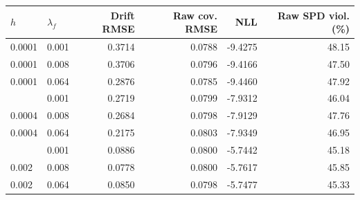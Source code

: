 \begin{tabular}{llrrrr}
\toprule
$h$ & $\lambda_f$ & Drift RMSE & Raw cov. RMSE & NLL & Raw SPD viol. (\%)\\
\midrule
0.0001 & 0.001 & 0.3714 & 0.0788 & -9.4275 & 48.15\\
0.0001 & 0.008 & 0.3706 & 0.0796 & -9.4166 & 47.50\\
0.0001 & 0.064 & 0.2876 & 0.0785 & -9.4460 & 47.92\\
\addlinespace
0.0004 & 0.001 & 0.2719 & 0.0799 & -7.9312 & 46.04\\
0.0004 & 0.008 & 0.2684 & 0.0798 & -7.9129 & 47.76\\
0.0004 & 0.064 & 0.2175 & 0.0803 & -7.9349 & 46.95\\
\addlinespace
0.002 & 0.001 & 0.0886 & 0.0800 & -5.7442 & 45.18\\
0.002 & 0.008 & 0.0778 & 0.0800 & -5.7617 & 45.85\\
0.002 & 0.064 & 0.0850 & 0.0798 & -5.7477 & 45.33\\
\bottomrule
\end{tabular}
